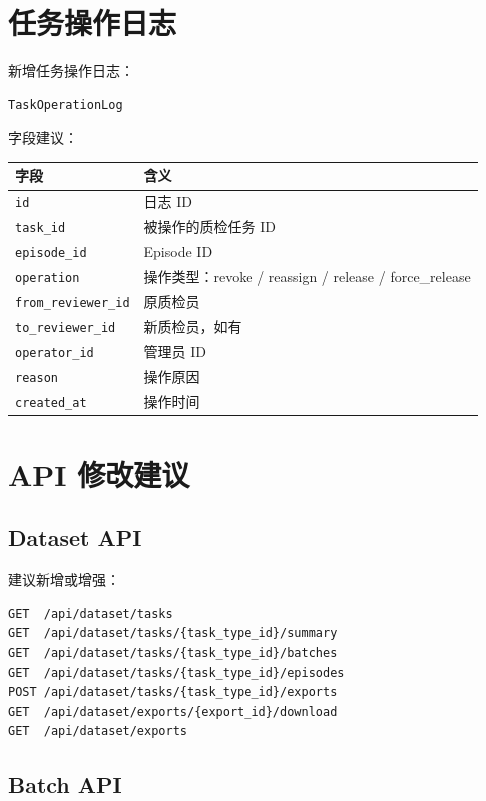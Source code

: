 \documentclass[UTF8,12pt,a4paper]{ctexart}
\begin{document}
\section{任务操作日志}

新增任务操作日志：

\begin{lstlisting}
TaskOperationLog
\end{lstlisting}

字段建议：

\begin{longtable}{p{5cm}p{10cm}}
\toprule
字段 & 含义 \\
\midrule
\texttt{id} & 日志 ID \\
\texttt{task\_id} & 被操作的质检任务 ID \\
\texttt{episode\_id} & Episode ID \\
\texttt{operation} & 操作类型：revoke / reassign / release / force\_release \\
\texttt{from\_reviewer\_id} & 原质检员 \\
\texttt{to\_reviewer\_id} & 新质检员，如有 \\
\texttt{operator\_id} & 管理员 ID \\
\texttt{reason} & 操作原因 \\
\texttt{created\_at} & 操作时间 \\
\bottomrule
\end{longtable}

\section{API 修改建议}

\subsection{Dataset API}

建议新增或增强：

\begin{lstlisting}
GET  /api/dataset/tasks
GET  /api/dataset/tasks/{task_type_id}/summary
GET  /api/dataset/tasks/{task_type_id}/batches
GET  /api/dataset/tasks/{task_type_id}/episodes
POST /api/dataset/tasks/{task_type_id}/exports
GET  /api/dataset/exports/{export_id}/download
GET  /api/dataset/exports
\end{lstlisting}

\subsection{Batch API}
\end{document}
